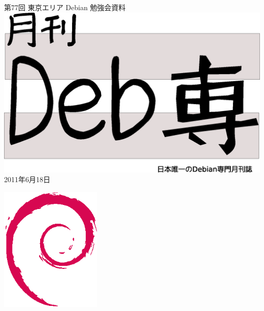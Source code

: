 \documentclass[mingoth,a4paper]{jsarticle}
\newcommand{\debmtgyear}{2011}
\newcommand{\debmtgmonth}{6}
\newcommand{\debmtgdate}{18}
\newcommand{\debmtgnumber}{77}
\begin{document}
\begin{titlepage}
\thispagestyle{empty}

\vspace*{-2cm}
第\debmtgnumber{}回 東京エリア Debian 勉強会資料\\
\hspace*{-2cm}
\includegraphics[width=210mm]{image201003/debsen.eps}\\
\hfill{}\debmtgyear{}年\debmtgmonth{}月\debmtgdate{}日



\vspace*{-2cm}
\hfill{}\includegraphics[height=6cm]{image200502/openlogo-nd.eps}
\end{titlepage}

\end{document}
